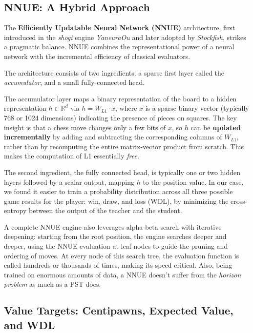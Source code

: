 \subsection{NNUE: A Hybrid Approach}\label{sec:nnue}

The \textbf{Efficiently Updatable Neural Network (NNUE)} architecture, first introduced in the \emph{shogi} engine \emph{YaneuraOu} and later adopted by \emph{Stockfish}, strikes a pragmatic balance. NNUE combines the representational power of a neural network with the incremental efficiency of classical evaluators.

The architecture consists of two ingredients: a sparse first layer called the \emph{accumulator}, and a small fully-connected head.

The accumulator layer maps a binary representation of the board to a hidden representation \(h \in \mathbb{R}^{d}\) via \(h = W_{L1} \cdot x\), where \(x\) is a sparse binary vector (typically 768 or 1024 dimensions) indicating the presence of pieces on squares. The key insight is that a chess move changes only a few bits of \(x\), so \(h\) can be \textbf{updated incrementally} by adding and subtracting the corresponding columns of \(W_{L1}\), rather than by recomputing the entire matrix-vector product from scratch. This makes the computation of L1 essentially \emph{free}.

The second ingredient, the fully connected head, is typically one or two hidden layers followed by a scalar output, mapping \(h\) to the position value. In our case, we found it easier to train a probability distribution across all three possible game results for the player: win, draw, and loss (WDL), by minimizing the cross-entropy between the output of the teacher and the student.

A complete NNUE engine also leverages alpha-beta search with iterative deepening: starting from the root position, the engine searches deeper and deeper, using the NNUE evaluation at leaf nodes to guide the pruning and ordering of moves. At every node of this search tree, the evaluation function is called hundreds or thousands of times, making its speed critical. Also, being trained on enormous amounts of data, a NNUE doesn't suffer from the \emph{horizon problem} as much as a PST does.

\subsection{Value Targets: Centipawns, Expected Value, and WDL}\label{sec:value-targets}

